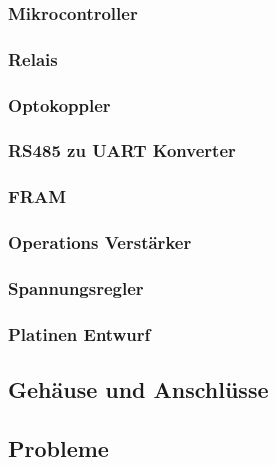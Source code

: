 \subsubsection{Mikrocontroller}
\subsubsection{Relais}
\subsubsection{Optokoppler}
\subsubsection{RS485 zu UART Konverter}
\subsubsection{FRAM}
\subsubsection{Operations Verstärker}
\subsubsection{Spannungsregler}
\subsubsection{Platinen Entwurf}
\subsection{Gehäuse und Anschlüsse}
\subsection{Probleme}